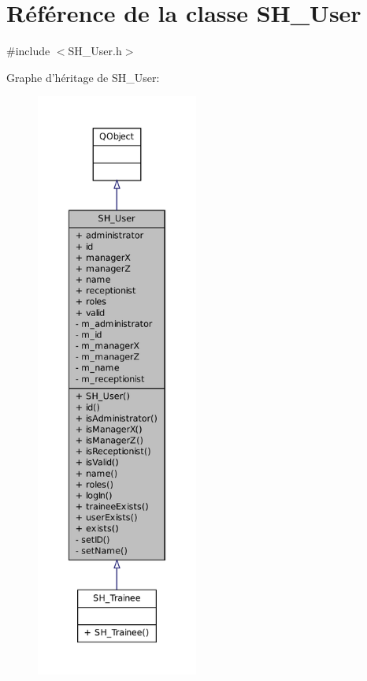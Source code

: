 \hypertarget{classSH__User}{\section{Référence de la classe S\-H\-\_\-\-User}
\label{classSH__User}
}


{\ttfamily \#include $<$S\-H\-\_\-\-User.\-h$>$}



Graphe d'héritage de S\-H\-\_\-\-User\-:
\nopagebreak
\begin{figure}[H]
\begin{center}
\leavevmode
\includegraphics[height=550pt]{classSH__User__inherit__graph}
\end{center}
\end{figure}


